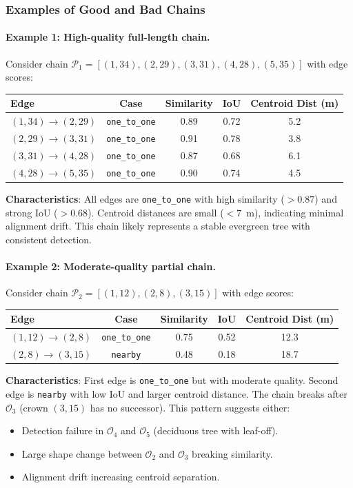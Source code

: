 \subsubsection{Examples of Good and Bad Chains}

\paragraph{Example 1: High-quality full-length chain.}
Consider chain $\mathcal{P}_1 = [(1, 34), (2, 29), (3, 31), (4, 28), (5, 35)]$ with edge scores:
\begin{center}
\begin{tabular}{lcccc}
\toprule
Edge & Case & Similarity & IoU & Centroid Dist (m) \\
\midrule
$(1,34) \to (2,29)$ & \texttt{one\_to\_one} & 0.89 & 0.72 & 5.2 \\
$(2,29) \to (3,31)$ & \texttt{one\_to\_one} & 0.91 & 0.78 & 3.8 \\
$(3,31) \to (4,28)$ & \texttt{one\_to\_one} & 0.87 & 0.68 & 6.1 \\
$(4,28) \to (5,35)$ & \texttt{one\_to\_one} & 0.90 & 0.74 & 4.5 \\
\bottomrule
\end{tabular}
\end{center}
\textbf{Characteristics}: All edges are \texttt{one\_to\_one} with high similarity ($>0.87$) and strong IoU ($>0.68$). Centroid distances are small ($<7$~m), indicating minimal alignment drift. This chain likely represents a stable evergreen tree with consistent detection.

\paragraph{Example 2: Moderate-quality partial chain.}
Consider chain $\mathcal{P}_2 = [(1, 12), (2, 8), (3, 15)]$ with edge scores:
\begin{center}
\begin{tabular}{lcccc}
\toprule
Edge & Case & Similarity & IoU & Centroid Dist (m) \\
\midrule
$(1,12) \to (2,8)$ & \texttt{one\_to\_one} & 0.75 & 0.52 & 12.3 \\
$(2,8) \to (3,15)$ & \texttt{nearby} & 0.48 & 0.18 & 18.7 \\
\bottomrule
\end{tabular}
\end{center}
\textbf{Characteristics}: First edge is \texttt{one\_to\_one} but with moderate quality. Second edge is \texttt{nearby} with low IoU and larger centroid distance. The chain breaks after $\mathcal{O}_3$ (crown $(3,15)$ has no successor). This pattern suggests either:
\begin{itemize}
    \item Detection failure in $\mathcal{O}_4$ and $\mathcal{O}_5$ (deciduous tree with leaf-off).
    \item Large shape change between $\mathcal{O}_2$ and $\mathcal{O}_3$ breaking similarity.
    \item Alignment drift increasing centroid separation.
\end{itemize}

